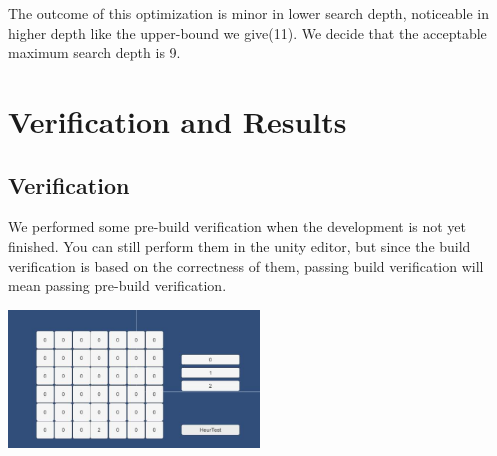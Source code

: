 \documentclass[12pt,a4paper]{article}
\begin{document}
	The outcome of this optimization is minor in lower search depth, noticeable in higher depth like the upper-bound we give(11). We decide that the acceptable maximum search depth is 9.
	
	
	\newpage
	\section{Verification and Results}
	\subsection{Verification}
	We performed some pre-build verification when the development is not yet finished. You can still perform them in the unity editor, but since the build verification is based on the correctness of them, passing build verification will mean passing pre-build verification.
	
	{\centering\includegraphics[width=0.5\textwidth]{Test}~\\}
\end{document}
